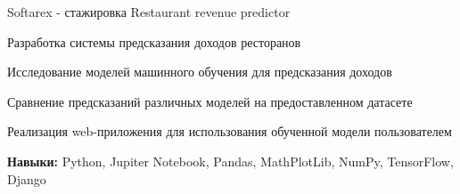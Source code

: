 \begin{cventries}
  \cventry
    {Softarex - стажировка} %
    {Restaurant revenue predictor} %
    {} %
    {} %
    {
      \begin{cvitems} %
        \item {Разработка системы предсказания доходов ресторанов}
        \item {Исследование моделей машинного обучения для предсказания доходов}
        \item {Сравнение предсказаний различных моделей на предоставленном датасете}
        \item {Реализация web-приложения для использования обученной модели пользователем}
        \item {\textbf{Навыки:} Python, Jupiter Notebook, Pandas, MathPlotLib, NumPy, TensorFlow, Django}
      \end{cvitems}
    }
\end{cventries}
